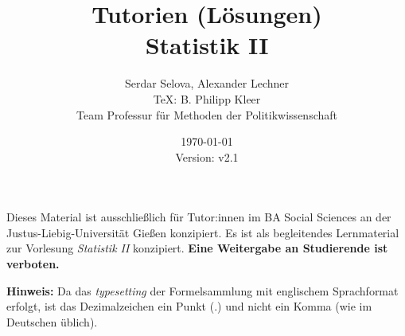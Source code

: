 \documentclass[11pt,a4paper]{article}
\author{Serdar Selova, Alexander Lechner \\ \TeX: B. Philipp Kleer \\ \footnotesize Team Professur für Methoden der Politikwissenschaft}
\title{%
  Tutorien (Lösungen)\\
  \normalsize Statistik II \\
  }
\date{\today \\ \small{Version: v2.1}}
\begin{document}
\maketitle

Dieses Material ist ausschließlich für Tutor:innen im BA Social Sciences an der Justus-Liebig-Universität Gießen konzipiert. Es ist als begleitendes Lernmaterial zur Vorlesung \textit{Statistik II} konzipiert. \textbf{Eine Weitergabe an Studierende ist verboten.}

\textbf{Hinweis:} Da das \textit{typesetting} der Formelsammlung mit englischem Sprachformat erfolgt, ist das Dezimalzeichen ein Punkt ($.$) und nicht ein Komma (wie im Deutschen üblich).

\tableofcontents 

\newpage



\newpage



\newpage



\newpage



\newpage



\newpage



\newpage



\newpage

%

\newpage

%
\end{document}
